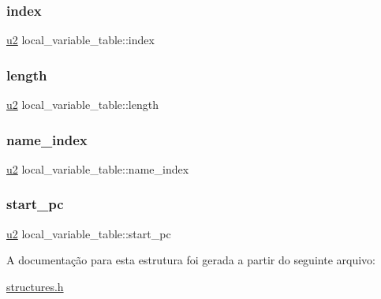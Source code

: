 \mbox{\label{structlocal__variable__table_af13a15b5fbb398323997b88d341a6c38}} 
\subsubsection{\texorpdfstring{index}{index}}
{\footnotesize\ttfamily \hyperlink{lista__operandos_8h_a732cde1300aafb73b0ea6c2558a7a54f}{u2} local\+\_\+variable\+\_\+table\+::index}

\mbox{\label{structlocal__variable__table_a76b778cea6d99b0854cba21e223569cc}} 
\subsubsection{\texorpdfstring{length}{length}}
{\footnotesize\ttfamily \hyperlink{lista__operandos_8h_a732cde1300aafb73b0ea6c2558a7a54f}{u2} local\+\_\+variable\+\_\+table\+::length}

\mbox{\label{structlocal__variable__table_a6c91f7b672683a35b1433c429de69069}} 
\subsubsection{\texorpdfstring{name\+\_\+index}{name\_index}}
{\footnotesize\ttfamily \hyperlink{lista__operandos_8h_a732cde1300aafb73b0ea6c2558a7a54f}{u2} local\+\_\+variable\+\_\+table\+::name\+\_\+index}

\mbox{\label{structlocal__variable__table_aa86e910619df9b3284535529bc887a12}} 
\subsubsection{\texorpdfstring{start\+\_\+pc}{start\_pc}}
{\footnotesize\ttfamily \hyperlink{lista__operandos_8h_a732cde1300aafb73b0ea6c2558a7a54f}{u2} local\+\_\+variable\+\_\+table\+::start\+\_\+pc}



A documentação para esta estrutura foi gerada a partir do seguinte arquivo\+:\begin{DoxyCompactItemize}
\item 
\hyperlink{structures_8h}{structures.\+h}\end{DoxyCompactItemize}
